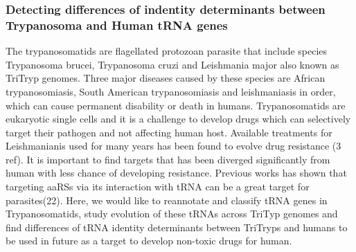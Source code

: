\documentclass[
10pt, %
a4paper, %
oneside, %
headinclude,footinclude, %
BCOR5mm, %
]{scrartcl}
\begin{document}
\subsubsection*{Detecting differences of indentity determinants between Trypanosoma and Human tRNA genes} 
The trypanosomatids are flagellated protozoan parasite that include species Trypanosoma brucei, Trypanosoma cruzi and Leishmania major also known as TriTryp genomes. Three major diseases caused by these species are African trypanosomiasis,  South American trypanosomiasis and leishmaniasis in order, which can cause permanent disability or death in humans. Trypanosomatids are eukaryotic single cells and it is a challenge to develop drugs which can selectively target their pathogen and not affecting human host. Available treatments for Leishmanianis used for many years has been found to evolve drug resistance (3 ref). It is important to find targets that has been diverged significantly from human with less chance of developing resistance. Previous works has shown that targeting  aaRSs via its interaction with tRNA can be a great target for parasites(22). Here, we would like to reannotate and classify tRNA genes in Trypanosomatids, study evolution of these tRNAs across TriTyp genomes and find differences of tRNA identity determinants between TriTryps and humans to be used in future as a target to develop non-toxic drugs for human. 

\newpage
\renewcommand{\refname}{\spacedlowsmallcaps{References}} %




\end{document}
